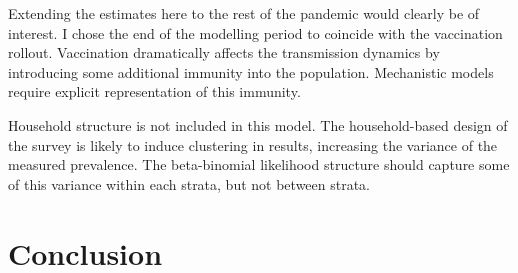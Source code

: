 \documentclass[thesis.tex]{subfiles}
\begin{document}
Extending the estimates here to the rest of the pandemic would clearly be of interest.
I chose the end of the modelling period to coincide with the vaccination rollout.
Vaccination dramatically affects the transmission dynamics by introducing some additional immunity into the population.
Mechanistic models require explicit representation of this immunity.

Household structure is not included in this model.
The household-based design of the survey is likely to induce clustering in results, increasing the variance of the measured prevalence.
The beta-binomial likelihood structure should capture some of this variance within each strata, but not between strata.

\section{Conclusion}

\ifSubfilesClassLoaded{
  \listoftodos
}{}
\end{document}
